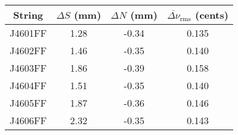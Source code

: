 \begin{tabular}{cccc}
\toprule
String & $\Delta S$ (mm) & $\Delta N$ (mm) & $\overline{\Delta \nu}_\text{rms}$ (cents) \\
\midrule
J4601FF & 1.28 & -0.34 & 0.135 \\
J4602FF & 1.46 & -0.35 & 0.140 \\
J4603FF & 1.86 & -0.39 & 0.158 \\
J4604FF & 1.51 & -0.35 & 0.140 \\
J4605FF & 1.87 & -0.36 & 0.146 \\
J4606FF & 2.32 & -0.35 & 0.143 \\
\bottomrule
\end{tabular}
